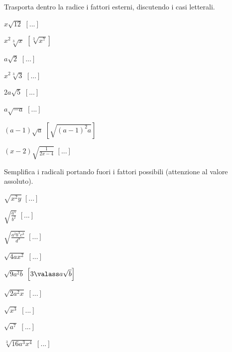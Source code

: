 \begin{esercizio}[\Ast]
 \label{ese:2.41}
Trasporta dentro la radice i fattori esterni, discutendo i casi letterali.
 \begin{multicols}{3}
 \begin{enumeratea}
 \item $x\sqrt{12}$
  \hfill $\left[...\right]$
 \item $x^2\sqrt[3]x$
  \hfill $\left[\sqrt[3]{x^7}\right]$
 \item $a\sqrt 2$
  \hfill $\left[...\right]$
 \item $x^2\sqrt[3]3$
  \hfill $\left[...\right]$
 \item $2a\sqrt 5$
  \hfill $\left[...\right]$
 \item $a\sqrt{-a}$
  \hfill $\left[...\right]$
 \item $(a-1)\sqrt a$
  \hfill $\left[\sqrt{(a-1)^2a}\right]$
 \item $(x-2)\sqrt{\frac 1{2x-4}}$
  \hfill $\left[...\right]$
 \end{enumeratea}
 \end{multicols}
\end{esercizio}

\begin{esercizio}[\Ast]
 \label{ese:2.44}
Semplifica i radicali portando fuori i fattori possibili 
(attenzione al valore assoluto).
 \begin{multicols}{3}
 \begin{enumeratea}
 \item $\sqrt{x^2y}$
  \hfill $\left[...\right]$
 \item $\sqrt{\frac{a^5}{b^2}}$
  \hfill $\left[...\right]$
 \item $\sqrt{\frac{a^2b^3c^3}{d^9}}$
  \hfill $\left[...\right]$
 \item $\sqrt{4ax^2}$
  \hfill $\left[...\right]$
 \item $\sqrt{9a^2b}$
  \hfill $\left[3\valass a\sqrt{b}\right]$
 \item $\sqrt{2a^2x}$
  \hfill $\left[...\right]$
 \item $\sqrt{x^3}$
  \hfill $\left[...\right]$
 \item $\sqrt{a^7}$
  \hfill $\left[...\right]$
 \item $\sqrt[3]{16a^3x^4}$
  \hfill $\left[...\right]$
 \end{enumeratea}
 \end{multicols}
\end{esercizio}

